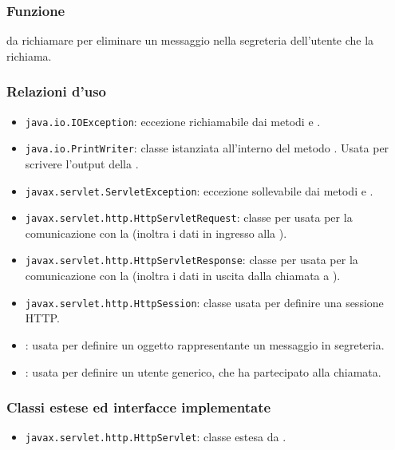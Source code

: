 
\subsubsection*{Funzione}
 da richiamare per eliminare un messaggio nella segreteria dell'utente che la richiama.

\subsubsection*{Relazioni d'uso}
\begin{itemize}
	\item \texttt{java.io.IOException}: eccezione richiamabile dai metodi  e .
	\item \texttt{java.io.PrintWriter}: classe istanziata all'interno del metodo . Usata per scrivere l'output della .
	\item \texttt{javax.servlet.ServletException}: eccezione sollevabile dai metodi  e .
	\item \texttt{javax.servlet.http.HttpServletRequest}:  classe per usata per la comunicazione con la  (inoltra i dati in ingresso alla ).
	\item \texttt{javax.servlet.http.HttpServletResponse}: classe per usata per la comunicazione con la  (inoltra i dati in uscita dalla chiamata a ).
	\item \texttt{javax.servlet.http.HttpSession}: classe usata per definire una sessione HTTP.
	\item {}: usata per definire un oggetto rappresentante un messaggio in segreteria.
	\item {}: usata per definire un utente generico, che ha partecipato alla chiamata.
\end{itemize}

\subsubsection*{Classi estese ed interfacce implementate}
\begin{itemize}
	\item \texttt{javax.servlet.http.HttpServlet}: classe estesa da .
\end{itemize}


